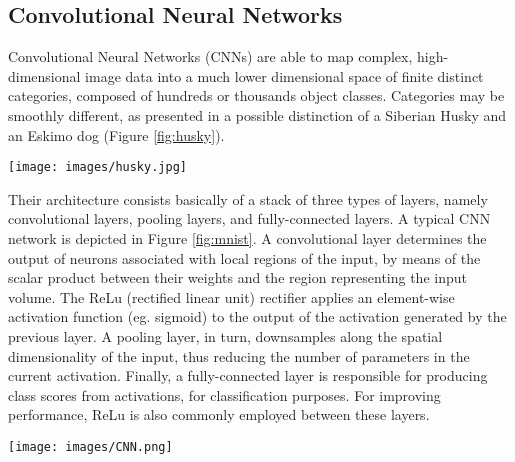 \subsection{Convolutional Neural Networks}

Convolutional Neural Networks (CNNs) are able to map complex, high-dimensional image data into a much lower dimensional space of finite distinct categories, composed of hundreds or thousands object classes. Categories may be smoothly different, as presented in a possible distinction of a Siberian Husky and an Eskimo dog (Figure \ref{fig:husky}). 

\begin{figure*}[!h]
\caption{Siberian Husky X Eskimo dog}
\label{fig:husky}
  \texttt{[image: images/husky.jpg]}
\end{figure*}

Their architecture consists basically of a stack of three types of layers, namely convolutional layers, pooling layers, and fully-connected layers. A typical CNN network is depicted in Figure \ref{fig:mnist}. A convolutional layer determines the output of neurons associated with local regions of the input, by means of the scalar product between their weights and the region representing the input volume. The ReLu (rectified linear unit) rectifier applies an element-wise activation function (eg. sigmoid) to the output of the activation generated by the previous layer. A pooling layer, in turn,  downsamples along the spatial dimensionality of the input, thus reducing the number of parameters in the current activation. Finally, a fully-connected layer is responsible for producing class scores from activations, for classification purposes. For improving performance, ReLu is also commonly employed between these layers. 


\begin{figure*}[!h]
\caption{Standard CNN architecture}
\label{fig:mnist}
  \texttt{[image: images/CNN.png]}
\end{figure*}
